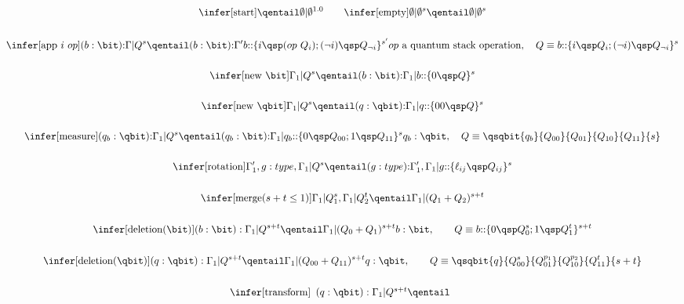 
\begin{figure}[htbp]
\[
\begin{gathered}
\infer[\mathrm{start}]
	{ \qentail \emptyset |\emptyset^{1.0}}{} \qquad
\infer[\mathrm{empty}]
	{\emptyset | \emptyset^s \qentail \emptyset |\emptyset^s}{}\\ 
\\
\infer[\text{app}\ i\ op]
    {(b:\bit){:}\Gamma | Q^s \qentail (b:\bit){:}\Gamma' 
       b{::}\{i \qsp (op\ Q_i) ; (\neg i) \qsp Q_{\neg i}\}^{s'}}
    { op\ \text{a  quantum stack operation},\quad Q\equiv
	  b{::}\{i \qsp Q_i ; (\neg i) \qsp Q_{\neg i}\}^{s}}\\
\\
\infer[\mathrm{new}\ \bit] 
      {\Gamma_1 | Q^s \qentail 
         (b:\bit){:}\Gamma_1 | b{::}\{0\qsp Q\}^s}{} \\ 
\\
\infer[\mathrm{new}\ \qbit]
     {\Gamma_1 | Q^s \qentail (q:\qbit){:}\Gamma_1 | q{::}\{00\qsp Q\}^s}{}\\ 
\\
\infer[\mathrm{measure}]
    {(q_b:\qbit){:}\Gamma_1 | Q^s \qentail 
           (q_b:\bit){:}\Gamma_1 | q_b{::}\{0\qsp Q_{00};1\qsp Q_{11}\}^s}
        {q_b:\qbit,\quad Q\equiv \qsqbit{q_b}{Q_{00}}{Q_{01}}{Q_{10}}{Q_{11}}{s}}\\ 
\\
\infer[\mathrm{rotation}]
    {\Gamma_1', g:type, \Gamma_1 | Q^s \qentail 
         (g:type){:}\Gamma_1',\Gamma_1 | g{::}\{\ell_{ij} \qsp Q_{ij}\}^s}{}\\ 
\\
\infer[\mathrm{merge} (s+t \le 1)]
    {\Gamma_1 | Q_1^s, \Gamma_1 | Q_2^t \qentail \Gamma_1 | (Q_1 + Q_2)^{s+t}}{}\\ 
\\
\infer[\mathrm{deletion (\bit)}]
    {(b:\bit):\Gamma_1 | Q^{s+t} \qentail 
             \Gamma_1 | (Q_0 + Q_1)^{s+t}}
    {b:\bit,\qquad Q \equiv b{::}\{0\qsp Q_{0}^s;1\qsp Q_{1}^t\}^{s+t} }\\ 
\\
\infer[\mathrm{deletion (\qbit)}]
    {(q:\qbit):\Gamma_1 | Q^{s+t} \qentail 
            \Gamma_1 | (Q_{00} + Q_{11})^{s+t}}
    {q:\qbit,\qquad Q\equiv \qsqbit{q}{Q_{00}^s}{Q_{01}^{p_1}}{Q_{10}^{p_2}}{Q_{11}^t}{s+t}}\\ 
\\
\infer[\mathrm{transform}]
   {\protect{
        \begin{array}{ll}
         (q:\qbit):\Gamma_1 | Q^{s+t} \qentail \\ 

\end{array}}}
\end{gathered}\]
\end{figure}
